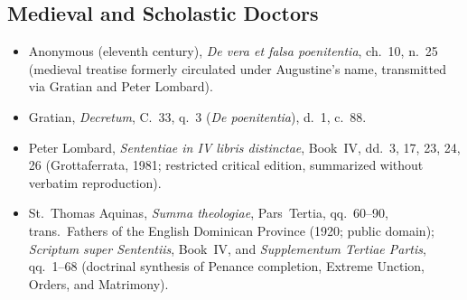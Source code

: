 \subsection{Medieval and Scholastic Doctors}
\begin{itemize}
\item Anonymous (eleventh century), \emph{De vera et falsa poenitentia}, ch.~10, n.~25 (medieval treatise formerly circulated under Augustine's name, transmitted via Gratian and Peter Lombard).
\item Gratian, \emph{Decretum}, C.~33, q.~3 (\emph{De poenitentia}), d.~1, c.~88.
\item Peter Lombard, \emph{Sententiae in IV libris distinctae}, Book~IV, dd.~3, 17, 23, 24, 26 (Grottaferrata, 1981; restricted critical edition, summarized without verbatim reproduction).
\item St.~Thomas Aquinas, \emph{Summa theologiae}, Pars~Tertia, qq.~60--90, trans.\ Fathers of the English Dominican Province (1920; public domain); \emph{Scriptum super Sententiis}, Book~IV, and \emph{Supplementum Tertiae Partis}, qq.~1--68 (doctrinal synthesis of Penance completion, Extreme Unction, Orders, and Matrimony).
\end{itemize}

